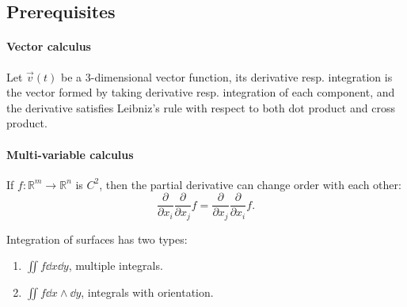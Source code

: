 \subsection{Prerequisites}
\label{sub:Prerequisites}
\paragraph{Vector calculus}
Let $\vec{v}(t)$ be a 3-dimensional vector function,
its derivative resp. integration is the vector formed by taking
derivative resp. integration of each component,
and the derivative satisfies Leibniz's rule with respect to both dot product
and cross product.

\paragraph{Multi-variable calculus}
If $f: \mathbb{R}^m\to \mathbb{R}^n$ is $C^2$, then the partial derivative
can change order with each other:
 \[
	 \frac{\partial}{\partial x_i} \frac{\partial}{\partial x_j} f =
	 \frac{\partial}{\partial x_j} \frac{\partial}{\partial x_i} f.
\]

Integration of surfaces has two types:
\begin{enumerate}
	\item $\iint f \dd x\dd y$, multiple integrals.
	\item  $\iint f \dd x\wedge \dd y$, integrals with orientation.
\end{enumerate}
